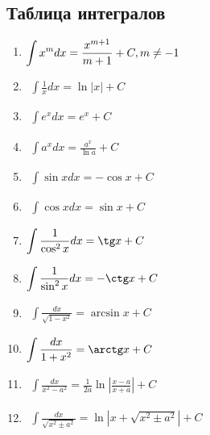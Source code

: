 \documentclass[12pt, fleqn]{book}
\begin{document}
	\subsection{Таблица интегралов}
	\begin{enumerate}[1)]
		\item $\begin{gathered}
			\int x^mdx=\frac{x^{m+1}}{m+1}+C, \space \space m \neq -1
		\end{gathered}$
		\item $\begin{gathered}
			\int \frac{1}{x}dx=\ln\left| x\right| + C
		\end{gathered}$
		\item $\begin{gathered}
			\int e^xdx=e^x+C
		\end{gathered}$
		\item $\begin{gathered}
			\int a^xdx=\frac{a^x}{\ln a}+C
		\end{gathered}$
		\item $\begin{gathered}
			\int \sin xdx=-\cos x + C
		\end{gathered}$
		\item $\begin{gathered}
			\int \cos x dx = \sin x + C
		\end{gathered}$
		\item $\begin{gathered}
			\int \frac{1}{\cos^2x}dx=\tg x + C
		\end{gathered}$
		\item $\begin{gathered}
			\int \frac{1}{\sin^2x}dx=-\ctg x + C
		\end{gathered}$
		\item $\begin{gathered}
			\int \frac{dx}{\sqrt{1-x^2}}=\arcsin x + C
		\end{gathered}$
		\item $\begin{gathered}
			\int \frac{dx}{1+x^2}=\arctg x + C
		\end{gathered}$
		\item $\begin{gathered}
			\int \frac{dx}{x^2-a^2}=\frac{1}{2a}\ln\left|\frac{x-a}{x+a} \right| +C
		\end{gathered}$
		\item $\begin{gathered}
			\int \frac{dx}{\sqrt{x^2\pm a^2}}=\ln \left| x+\sqrt{x^2\pm a^2}\right| + C
		\end{gathered}$
	\end{enumerate}
\end{document}
